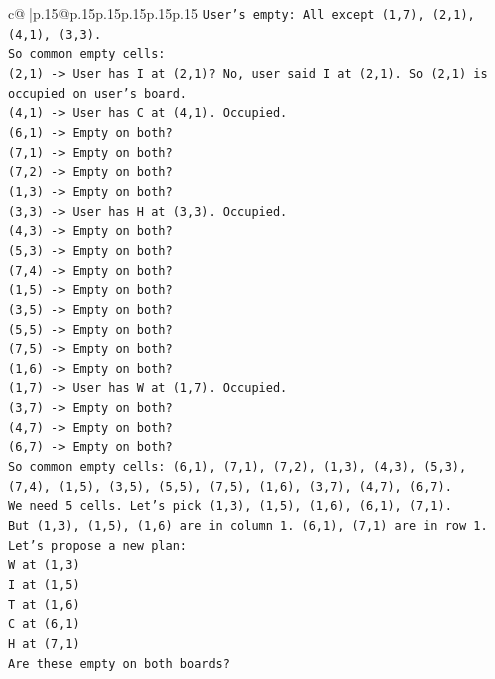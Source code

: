 \documentclass{article}
\begin{document}
{\begin{supertabular}{c@{$\;$}|p{.15\linewidth}@{}p{.15\linewidth}p{.15\linewidth}p{.15\linewidth}p{.15\linewidth}p{.15\linewidth}}
{{{\texttt{User's empty: All except (1,7), (2,1), (4,1), (3,3).} \\
\texttt{So common empty cells:} \\
\texttt{(2,1) {-}> User has I at (2,1)? No, user said I at (2,1). So (2,1) is occupied on user's board.} \\
\texttt{(4,1) {-}> User has C at (4,1). Occupied.} \\
\texttt{(6,1) {-}> Empty on both?} \\
\texttt{(7,1) {-}> Empty on both?} \\
\texttt{(7,2) {-}> Empty on both?} \\
\texttt{(1,3) {-}> Empty on both?} \\
\texttt{(3,3) {-}> User has H at (3,3). Occupied.} \\
\texttt{(4,3) {-}> Empty on both?} \\
\texttt{(5,3) {-}> Empty on both?} \\
\texttt{(7,4) {-}> Empty on both?} \\
\texttt{(1,5) {-}> Empty on both?} \\
\texttt{(3,5) {-}> Empty on both?} \\
\texttt{(5,5) {-}> Empty on both?} \\
\texttt{(7,5) {-}> Empty on both?} \\
\texttt{(1,6) {-}> Empty on both?} \\
\texttt{(1,7) {-}> User has W at (1,7). Occupied.} \\
\texttt{(3,7) {-}> Empty on both?} \\
\texttt{(4,7) {-}> Empty on both?} \\
\texttt{(6,7) {-}> Empty on both?} \\
\texttt{So common empty cells: (6,1), (7,1), (7,2), (1,3), (4,3), (5,3), (7,4), (1,5), (3,5), (5,5), (7,5), (1,6), (3,7), (4,7), (6,7).} \\
\texttt{We need 5 cells. Let's pick (1,3), (1,5), (1,6), (6,1), (7,1).} \\
\texttt{But (1,3), (1,5), (1,6) are in column 1. (6,1), (7,1) are in row 1.} \\
\texttt{Let's propose a new plan:} \\
\texttt{W at (1,3)} \\
\texttt{I at (1,5)} \\
\texttt{T at (1,6)} \\
\texttt{C at (6,1)} \\
\texttt{H at (7,1)} \\
\texttt{Are these empty on both boards?} \\
}}}
\end{supertabular}}
\end{document}
